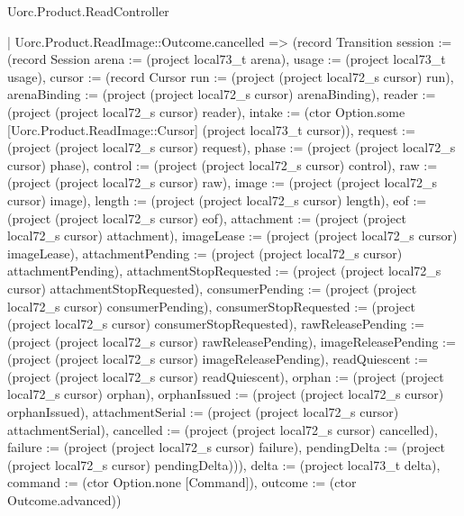 \begin{lexlean}{Uorc.Product.ReadController}
\begin{semanticmodule}
{    | Uorc.Product.ReadImage::Outcome.cancelled => (record Transition {session := (record Session {arena := (project local73_t arena), usage := (project local73_t usage), cursor := (record Cursor {run := (project (project local72_s cursor) run), arenaBinding := (project (project local72_s cursor) arenaBinding), reader := (project (project local72_s cursor) reader), intake := (ctor Option.some [Uorc.Product.ReadImage::Cursor] (project local73_t cursor)), request := (project (project local72_s cursor) request), phase := (project (project local72_s cursor) phase), control := (project (project local72_s cursor) control), raw := (project (project local72_s cursor) raw), image := (project (project local72_s cursor) image), length := (project (project local72_s cursor) length), eof := (project (project local72_s cursor) eof), attachment := (project (project local72_s cursor) attachment), imageLease := (project (project local72_s cursor) imageLease), attachmentPending := (project (project local72_s cursor) attachmentPending), attachmentStopRequested := (project (project local72_s cursor) attachmentStopRequested), consumerPending := (project (project local72_s cursor) consumerPending), consumerStopRequested := (project (project local72_s cursor) consumerStopRequested), rawReleasePending := (project (project local72_s cursor) rawReleasePending), imageReleasePending := (project (project local72_s cursor) imageReleasePending), readQuiescent := (project (project local72_s cursor) readQuiescent), orphan := (project (project local72_s cursor) orphan), orphanIssued := (project (project local72_s cursor) orphanIssued), attachmentSerial := (project (project local72_s cursor) attachmentSerial), cancelled := (project (project local72_s cursor) cancelled), failure := (project (project local72_s cursor) failure), pendingDelta := (project (project local72_s cursor) pendingDelta)})}), delta := (project local73_t delta), command := (ctor Option.none [Command]), outcome := (ctor Outcome.advanced)})
}
\end{semanticmodule}
\end{lexlean}
